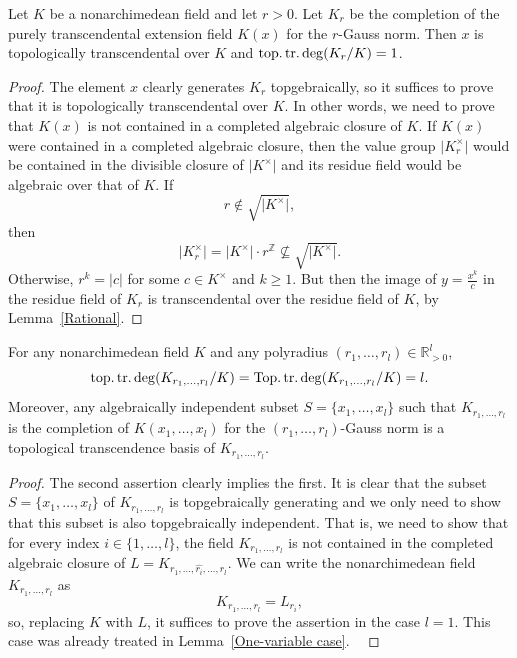 \begin{lemma}\label{One-variable case}Let $K$ be a nonarchimedean field and let $r>0$. Let $K_{r}$ be the completion of the purely transcendental extension field $K(x)$ for the $r$-Gauss norm. Then $x$ is topologically transcendental over $K$ and $\operatorname{top.tr.deg}(K_r/K)=1$. \end{lemma}
\begin{proof}The element $x$ clearly generates $K_r$ topgebraically, so it suffices to prove that it is topologically transcendental over $K$. In other words, we need to prove that $K(x)$ is not contained in a completed algebraic closure of $K$. 
If $K(x)$ were contained in a completed algebraic closure, then the value group $\vert K_{r}^{\times}\vert$ would be contained in the divisible closure of $\vert K^{\times}\vert$ and its residue field would be algebraic over that of $K$. 
If \begin{equation*}r\not\in \sqrt{\vert K^{\times}\vert},\end{equation*}then \begin{equation*}\vert K_{r}^{\times}\vert=\vert K^{\times}\vert\cdot r^{\mathbb{Z}}\not\subseteq \sqrt{\vert K^{\times}\vert}.\end{equation*}
Otherwise, $r^{k}=\vert c\vert$ for some $c\in K^{\times}$ and $k\geq1$. But then the image of $y=\frac{x^{k}}{c}$ in the residue field of $K_{r}$ is transcendental over the residue field of $K$, by Lemma~\ref{Rational}.\end{proof}
\begin{thm}\label{Main theorem}
For any nonarchimedean field $K$ and any polyradius $(r_1,\dots, r_l)\in \mathbb{R}_{>0}^{l}$, 
\begin{equation*}
\operatorname{top.tr.deg}(K_{r_1,\dots, r_l}/K)=\operatorname{Top.tr.deg}(K_{r_1,\dots, r_l}/K)=l.
\end{equation*}Moreover, any algebraically independent subset $S=\{x_1,\dots, x_l\}$ such that $K_{r_1,\dots, r_l}$ is the completion of $K(x_1,\dots, x_l)$ for the $(r_1,\dots, r_l)$-Gauss norm is a topological transcendence basis of $K_{r_1,\dots, r_l}$. 
\end{thm}
\begin{proof}The second assertion clearly implies the first. It is clear that the subset $S=\{x_1,\dots, x_l\}$ of $K_{r_1,\dots, r_l}$ is topgebraically generating and we only need to show that this subset is also topgebraically independent. That is, we need to show that for every index $i\in\{1,\dots, l\}$, the field $K_{r_1,\dots, r_l}$ is not contained in the completed algebraic closure of $L=K_{r_1,\dots, \hat{r_{i}},\dots, r_l}$. We can write the nonarchimedean field $K_{r_1,\dots, r_l}$ as \begin{equation*}K_{r_1,\dots, r_l}=L_{r_{i}},\end{equation*}so, replacing $K$ with $L$, it suffices to prove the assertion in the case $l=1$. This case was already treated in Lemma~\ref{One-variable case}.  \end{proof}


